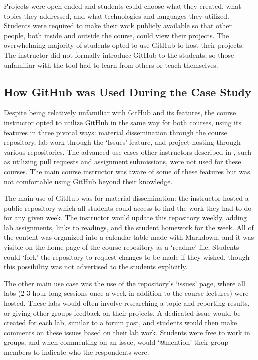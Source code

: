 Projects were open-ended and students could choose what they created, what topics they addressed, and what technologies and languages they utilized. Students were required to make their work publicly available so that other people, both inside and outside the course, could view their projects. The overwhelming majority of students opted to use GitHub to host their projects. The instructor did not formally introduce GitHub to the students, so those unfamiliar with the tool had to learn from others or teach themselves.

\subsection{How GitHub was Used During the Case Study}
Despite being relatively unfamiliar with GitHub and its features, the course instructor opted to utilize GitHub in the same way for both courses, using its features in three pivotal ways: material dissemination through the course repository, lab work through the `Issues' feature, and project hosting through various repositories. The advanced use cases other instructors described in \cite{zagalsky2015emergence}, such as utilizing pull requests and assignment submissions, were not used for these courses. The main course instructor was aware of some of these features but was not comfortable using GitHub beyond their knowledge.

The main use of GitHub was for material dissemination: the instructor hosted a public repository which all students could access to find the work they had to do for any given week. The instructor would update this repository weekly, adding lab assignments, links to readings, and the student homework for the week. All of the content was organized into a calendar table made with Markdown, and it was visible on the home page of the course repository as a `readme' file. Students could `fork' the repository to request changes to be made if they wished, though this possibility was not advertised to the students explicitly.

The other main use case was the use of the repository's `issues' page, where all labs (2-3 hour long sessions once a week in addition to the course lectures) were hosted. These labs would often involve researching a topic and reporting results, or giving other groups feedback on their projects. A dedicated issue would be created for each lab, similar to a forum post, and students would then make comments on these issues based on their lab work. Students were free to work in groups, and when commenting on an issue, would `@mention' their group members to indicate who the respondents were.

